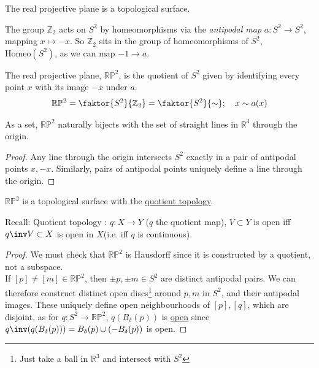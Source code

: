 \begin{example}
	The real projective plane is a topological surface.

	The group $\mathbb Z_2$ acts on $S^2$ by homeomorphisms via the \textit{antipodal map} $a : S^2 \to S^2$, mapping $x \mapsto -x$.
	So $\mathbb{Z}_2$ sits in the group of homeomorphisms of $S^2$, $\mathrm{Homeo}(S^2)$, as we can map $-1 \to a$.

	\begin{definition}
		The real projective plane, $\mathbb{R} \mathbb{P}^2$, is the quotient of $S^2$ given by identifying every point $x$ with its image $-x$ under $a$.
		\begin{align*}
			\mathbb R \mathbb P^2 = \faktor{S^2}{\mathbb Z_2} = \faktor{S^2}{\sim};\quad x \sim a(x)
		\end{align*}
	\end{definition} 

	\begin{lemma}
		As a set, $\mathbb R \mathbb P^2$ naturally bijects with the set of straight lines in $\mathbb R^3$ through the origin.
	\end{lemma}

	\begin{proof}
		Any line through the origin intersects $S^2$ exactly in a pair of antipodal points $x, -x$.
		Similarly, pairs of antipodal points uniquely define a line through the origin.
	\end{proof}
	
	\begin{lemma}
		$\mathbb R \mathbb P^2$ is a topological surface with the \underline{quotient topology}.
	\end{lemma}

	Recall: Quotient topology : $q : X \to Y$ ($q$ the quotient map), $V \subset Y$ is open iff $q\inv V \subset X$ is open in $X$(i.e. iff $q$ is continuous).
	
	\begin{proof}
		We must check that $\mathbb R \mathbb P^2$ is Hausdorff since it is constructed by a quotient, not a subspace. \\
		If $[p] \neq [m] \in \mathbb R \mathbb P^2$, then $\pm p, \pm m \in S^2$ are distinct antipodal pairs.
		We can therefore construct distinct open discs\footnote{Just take a ball in $\mathbb{R}^3$ and intersect with $S^2$} around $p, m$ in $S^2$, and their antipodal images.
		These uniquely define open neighbourhoods of $[p], [q]$, which are disjoint, as for $q : S^2 \to \mathbb{R} \mathbb{P}^2$, $q(B_\delta(p))$ is \underline{open} since $q\inv(q(B_\delta(p))) = B_\delta(p) \cup (-B_\delta(p))$ is open.


\end{proof}
\end{example}
